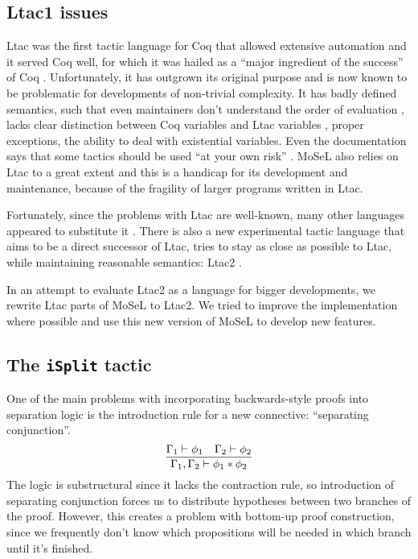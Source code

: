 \subsection{Ltac1 issues}
\label{sec:ltac1-issues}
Ltac was the first tactic language for Coq that allowed extensive automation and it served Coq well, for which it was hailed as a ``major ingredient of the success'' of Coq \cite{pedrotLtac2TacticalWarfare2019}.
Unfortunately, it has outgrown its original purpose and is now known to be problematic for developments of non-trivial complexity.
It has badly defined semantics, such that even maintainers don't understand the order of evaluation \cite{pedrotLtacInternals2016}, lacks clear distinction between Coq variables and Ltac variables \cite{pedrotLtacInternals2016}, proper exceptions, the ability to deal with existential variables.
Even the documentation says that some tactics should be used ``at your own risk'' \cite[Section~3.3.1]{thecoqdevelopmentteamCoqProofAssistant2020}.
MoSeL also relies on Ltac to a great extent and this is a handicap for its development and maintenance, because of the fragility of larger programs written in Ltac.

Fortunately, since the problems with Ltac are well-known, many other languages appeared to substitute it \cite{malechaExtensibleEfficientAutomation2016, zilianiMtacMonadTyped2013, kaiserMtac2TypedTactics2018a, tassiElpiExtensionLanguage2018}.
There is also a new experimental tactic language that aims to be a direct successor of Ltac, tries to stay as close as possible to Ltac, while maintaining reasonable semantics: Ltac2 \cite{pedrotLtac2TacticalWarfare2019}.

In an attempt to evaluate Ltac2 as a language for bigger developments, we rewrite Ltac parts of MoSeL to Ltac2.
We tried to improve the implementation where possible and use this new version of MoSeL to develop new features.

\subsection{The \texttt{iSplit} tactic}
\label{sec:isplit-tactic}

One of the main problems with incorporating backwards-style proofs into separation logic is the introduction rule for a new connective: ``separating conjunction''.
\[\infer{\Gamma_1, \Gamma_2 \vdash \phi_1 \ast \phi_2}
        {\Gamma_1 \vdash \phi_1 &
         \Gamma_2 \vdash \phi_2} \]
The logic is substructural since it lacks the contraction rule, so introduction of separating conjunction forces us to distribute hypotheses between two branches of the proof.
However, this creates a problem with bottom-up proof construction, since we frequently don't know which propositions will be needed in which branch until it's finished.

